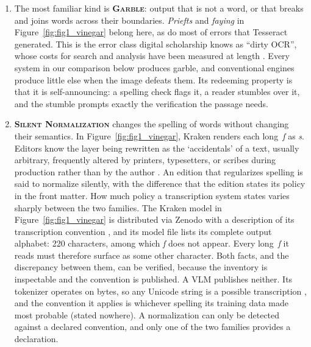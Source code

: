 \documentclass{anthology-ch}         %
\begin{document}
\begin{enumerate}
    \item The most familiar kind is \textsc{\textbf{Garble}}: output that is not a word, or that breaks and joins words across their boundaries. \emph{Priefts} and \emph{faying} in Figure~\ref{fig:fig1_vinegar} belong here, as do most of errors that Tesseract generated. This is the error class digital scholarship knows as ``dirty OCR'', whose costs for search and analysis have been measured at length \cite{traub_impact_2015, hill_quantifying_2019}. Every system in our comparison below produces garble, and conventional engines produce little else when the image defeats them. Its redeeming property is that it is self-announcing: a spelling check flags it, a reader stumbles over it, and the stumble prompts exactly the verification the passage needs.
    
    \item \textsc{\textbf{Silent Normalization}} changes the spelling of words without changing their semantics. In Figure~\ref{fig:fig1_vinegar}, Kraken renders each long~\emph{ſ} as \emph{s}. Editors know the layer being rewritten as the `accidentals' of a text, usually arbitrary, frequently altered by printers, typesetters, or scribes during production rather than by the author \cite{greg_rationale_1950}. An edition that regularizes spelling is said to normalize silently, with the difference that the edition states its policy in the front matter. How much policy a transcription system states varies sharply between the two families. The Kraken model in Figure~\ref{fig:fig1_vinegar} is distributed via Zenodo with a description of its transcription convention \cite{gabay_catmus-print_2024}, and its model file lists its complete output alphabet: 220 characters, among which \emph{ſ} does not appear. Every long~\emph{ſ} it reads must therefore surface as some other character. Both facts, and the discrepancy between them, can be verified, because the inventory is inspectable and the convention is published. A VLM publishes neither. Its tokenizer operates on bytes, so any Unicode string is a possible transcription \cite{kudo_sentencepiece_2018, radford_language_2019}, and the convention it applies is whichever spelling its training data made most probable (stated nowhere). A normalization can only be detected against a declared convention, and only one of the two families provides a declaration.


\end{enumerate}
\end{document}
